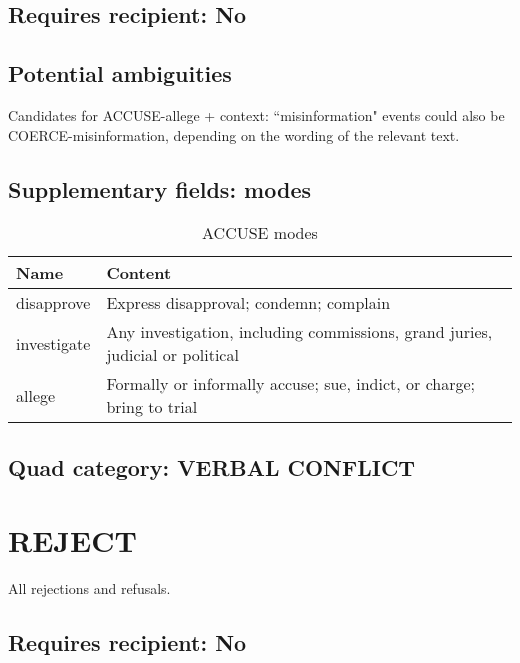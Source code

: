 \documentclass[11pt]{report}
\newcommand{\plcat}[1]{\textsf{#1}}
\begin{document}
\subsection{Requires recipient: No}

\subsection{Potential ambiguities}

Candidates for \plcat{ACCUSE}-allege + context: ``misinformation" events could also be \plcat{COERCE}-misinformation, depending on the wording of the relevant text.

\subsection{Supplementary fields: modes}

\begin{table}[htp]
\caption{\plcat{ACCUSE} modes}
\begin{center}
\begin{tabular}{|l|p{13cm}|}
\hline
Name & Content \\
\hline
disapprove & Express disapproval; condemn; complain\\
investigate & Any investigation, including commissions, grand juries, judicial or political\\
allege & Formally or informally accuse; sue, indict, or charge; bring to trial\\
\hline
\end{tabular}
\end{center}
\label{tab:accusemode}
\end{table}%

\subsection{Quad category: VERBAL CONFLICT}

\newpage


\section{REJECT}

All rejections and refusals.

\subsection{Requires recipient: No}
\end{document}

